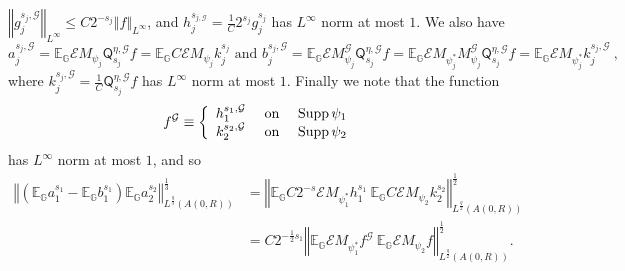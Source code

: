 \documentclass{amsart}%
\theoremstyle{plain}
\numberwithin{equation}{section}
\begin{document}
$\left\Vert g_{j}^{s_{j},\mathcal{G}}\right\Vert _{L^{\infty}}\leq C2^{-s_{j}%
}\left\Vert f\right\Vert _{L^{\infty}}$, and $h_{j}^{s_{j,\mathcal{G}}}%
=\frac{1}{C}2^{s_{j}}g_{j}^{s_{j}}$ has $L^{\infty}$ norm at most $1$. We also
have%
\begin{equation}
a_{j}^{s_{j},\mathcal{G}}=\mathbb{E}_{\mathbb{G}}\mathcal{E}M_{\psi_{j}%
}\mathsf{Q}_{s_{j}}^{\eta,\mathcal{G}}f=\mathbb{E}_{\mathbb{G}}C\mathcal{E}%
M_{\psi_{j}}k_{j}^{s_{j}}\text{ and }b_{j}^{s_{j},\mathcal{G}}=\mathbb{E}%
_{\mathbb{G}}\mathcal{E}M_{\psi_{j}}^{\mathcal{G}}\mathsf{Q}_{s_{j}}%
^{\eta,\mathcal{G}}f=\mathbb{E}_{\mathbb{G}}\mathcal{E}M_{\psi_{j}^{\ast}%
}M_{\psi_{j}}^{\mathcal{G}}\mathsf{Q}_{s_{j}}^{\eta,\mathcal{G}}%
f=\mathbb{E}_{\mathbb{G}}\mathcal{E}M_{\psi_{j}^{\ast}}k_{j}^{s_{j}%
,\mathcal{G}}\ ,\label{ab formual}%
\end{equation}
where $k_{j}^{s_{j},\mathcal{G}}=\frac{1}{C}\mathsf{Q}_{s_{j}}^{\eta
,\mathcal{G}}f$ has $L^{\infty}$ norm at most $1$. Finally we note that the
function%
\[
f^{\mathcal{G}}\equiv\left\{
\begin{array}
[c]{ccc}%
h_{1}^{s_{1},\mathcal{G}} & \text{ on } & \operatorname*{Supp}\psi_{1}\\
k_{2}^{s_{2},\mathcal{G}} & \text{ on } & \operatorname*{Supp}\psi_{2}%
\end{array}
\right.
\]
has $L^{\infty}$ norm at most $1$, and so%
\begin{align*}
\left\Vert \left(  \mathbb{E}_{\mathbb{G}}a_{1}^{s_{1}}-\mathbb{E}%
_{\mathbb{G}}b_{1}^{s_{1}}\right)  \mathbb{E}_{\mathbb{G}}a_{2}^{s_{2}%
}\right\Vert _{L^{\frac{q}{3}}\left(  A\left(  0,R\right)  \right)  }%
^{\frac{1}{3}}  & =\left\Vert \mathbb{E}_{\mathbb{G}}C2^{-s}\mathcal{E}%
M_{\psi_{1}^{\ast}}h_{1}^{s_{1}}\ \mathbb{E}_{\mathbb{G}}C\mathcal{E}%
M_{\psi_{2}}k_{2}^{s_{2}}\right\Vert _{L^{\frac{q}{2}}\left(  A\left(
0,R\right)  \right)  }^{\frac{1}{2}}\\
& =C2^{-\frac{1}{2}s_{1}}\left\Vert \mathbb{E}_{\mathbb{G}}\mathcal{E}%
M_{\psi_{1}^{\ast}}f^{\mathcal{G}}\ \mathbb{E}_{\mathbb{G}}\mathcal{E}%
M_{\psi_{2}}f\right\Vert _{L^{\frac{q}{2}}\left(  A\left(  0,R\right)
\right)  }^{\frac{1}{2}}.
\end{align*}
\end{document}
